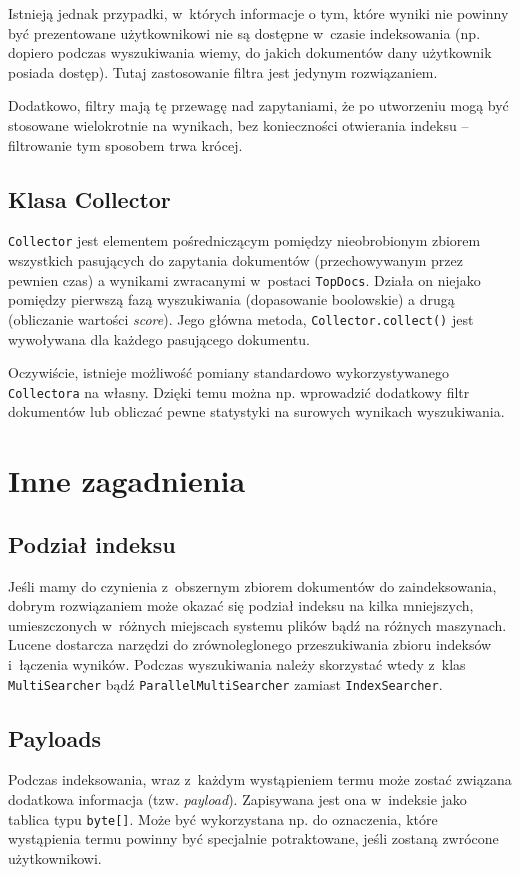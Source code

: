 Istnieją jednak przypadki, w~których informacje o tym, które wyniki nie powinny być prezentowane użytkownikowi nie są dostępne w~czasie indeksowania (np. dopiero podczas wyszukiwania wiemy, do jakich dokumentów dany użytkownik posiada dostęp). Tutaj zastosowanie filtra jest jedynym rozwiązaniem. 

Dodatkowo, filtry mają tę przewagę nad zapytaniami, że po utworzeniu mogą być stosowane wielokrotnie na wynikach, bez konieczności otwierania indeksu -- filtrowanie tym sposobem trwa krócej. 

\subsection{Klasa Collector}

\texttt{Collector} jest elementem pośredniczącym pomiędzy nieobrobionym zbiorem wszystkich pasujących do zapytania dokumentów (przechowywanym przez pewnien czas) a wynikami zwracanymi w~postaci \texttt{TopDocs}. Działa on niejako pomiędzy pierwszą fazą wyszukiwania (dopasowanie boolowskie) a drugą (obliczanie wartości \emph{score}). Jego główna metoda, \texttt{Collector.collect()} jest wywoływana dla każdego pasującego dokumentu. 

Oczywiście, istnieje możliwość pomiany standardowo wykorzystywanego \texttt{Collectora} na własny. Dzięki temu można np. wprowadzić dodatkowy filtr dokumentów lub obliczać pewne statystyki na surowych wynikach wyszukiwania.

\section{Inne zagadnienia}

\subsection{Podział indeksu}

Jeśli mamy do czynienia z~obszernym zbiorem dokumentów do zaindeksowania, dobrym rozwiązaniem może okazać się podział indeksu na kilka mniejszych, umieszczonych w~różnych miejscach systemu plików bądź na różnych maszynach. Lucene dostarcza narzędzi do zrównoleglonego przeszukiwania zbioru indeksów i~łączenia wyników. Podczas wyszukiwania należy skorzystać wtedy z~klas \texttt{MultiSearcher} bądź \texttt{ParallelMultiSearcher} zamiast \texttt{IndexSearcher}.

\subsection{Payloads}

Podczas indeksowania, wraz z~każdym wystąpieniem termu może zostać związana dodatkowa informacja (tzw. \emph{payload}). Zapisywana jest ona w~indeksie jako tablica typu \texttt{byte[]}. Może być wykorzystana np. do oznaczenia, które wystąpienia termu powinny być specjalnie potraktowane, jeśli zostaną zwrócone użytkownikowi.